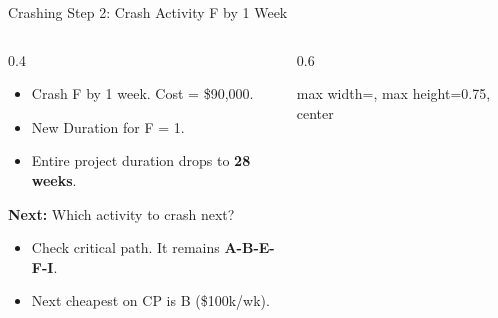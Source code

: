 \documentclass[11pt,aspectratio=169]{beamer}
\begin{document}
\begin{frame}{Crashing Step 2: Crash Activity F by 1 Week}
    \begin{columns}[T]
    \begin{column}{0.4\textwidth}
        \small
        \begin{itemize}
            \item Crash F by 1 week. Cost = \$90,000.
            \item New Duration for F = 1.
            \item Entire project duration drops to \textbf{28 weeks}.
        \end{itemize}
        \vspace{1em}
        \textbf{Next:} Which activity to crash next?
        \begin{itemize}
            \item Check critical path. It remains \textbf{A-B-E-F-I}.
            \item Next cheapest on CP is B (\$100k/wk).
        \end{itemize}
    \end{column}
    \begin{column}{0.6\textwidth}
        \begin{adjustbox}{max width=\linewidth, max height=0.75\textheight, center}
\end{adjustbox}
\end{column}
\end{columns}
\end{frame}
\end{document}
